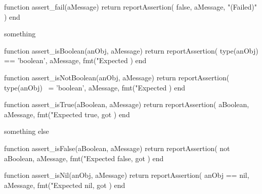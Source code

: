 \stopTestSuite

\startTestSuite[title=assert_fail]

\startLuaCode
function assert_fail(aMessage)
  return reportAssertion(
    false,
    aMessage,
    "(Failed)"
  )
end
\stopLuaCode

\startTestCase[title=should fail]

\startLuaTest
  something
\stopLuaTest

\stopTestCase
\stopTestSuite

\startTestSuite[title=assert_isBoolean]

\startLuaCode
function assert_isBoolean(anObj, aMessage)
  return reportAssertion(
    type(anObj) == 'boolean',
    aMessage,
    fmt("Expected %
  )
end
\stopLuaCode

\stopTestSuite

\startTestSuite[title=assert_isNotBoolean]

\startLuaCode
function assert_isNotBoolean(anObj, aMessage)
  return reportAssertion(
    type(anObj) ~= 'boolean',
    aMessage,
    fmt("Expected %
  )
end
\stopLuaCode

\stopTestSuite

\startTestSuite[title=assert_isTrue]

\startLuaCode
function assert_isTrue(aBoolean, aMessage)
  return reportAssertion(
    aBoolean,
    aMessage,
    fmt("Expected true, got %
  )
end
\stopLuaCode

\startTestCase[title=should succeed]

\startLuaTest
  something else
\stopLuaTest

\stopTestCase
\stopTestSuite

\startTestSuite[title=assert_isFalse]

\startLuaCode
function assert_isFalse(aBoolean, aMessage)
  return reportAssertion(
    not aBoolean,
    aMessage,
    fmt("Expected false, got %
  )
end
\stopLuaCode

\stopTestSuite

\startTestSuite[title=assert_isNil]

\startLuaCode
function assert_isNil(anObj, aMessage)
  return reportAssertion(
    anObj == nil,
    aMessage,
    fmt("Expected nil, got %
  )
end
\stopLuaCode

\stopTestSuite

\startTestSuite[title=assert_isNotNil]

